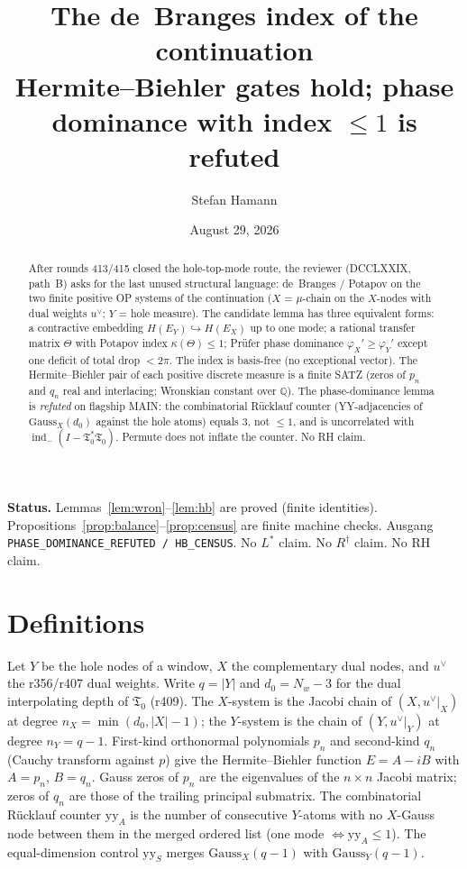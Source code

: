 \documentclass[11pt]{article}
\title{\bfseries The de~Branges index of the continuation\\[2mm]
\large Hermite--Biehler gates hold;
phase dominance with index $\le 1$ is refuted}
\author{Stefan Hamann}
\date{August 29, 2026}
\theoremstyle{remark}
\newcommand{\Tfrak}{\mathfrak{T}}
\newcommand{\indm}{\operatorname{ind}_{-}}
\begin{document}
\maketitle

\begin{abstract}\noindent
After rounds 413/415 closed the hole-top-mode route, the
reviewer (DCCLXXIX, path~B) asks for the last unused
structural language: de~Branges / Potapov on the two finite
positive OP systems of the continuation
($X$ = $\mu$-chain on the $X$-nodes with dual weights $u^\vee$;
$Y$ = hole measure).
The candidate lemma has three equivalent forms: a contractive
embedding $H(E_Y)\hookrightarrow H(E_X)$ up to one mode; a
rational transfer matrix $\Theta$ with Potapov index
$\kappa(\Theta)\le 1$; Pr\"ufer phase dominance
$\varphi_X'\ge\varphi_Y'$ except one deficit of total drop
$<2\pi$.
The index is basis-free (no exceptional vector).
The Hermite--Biehler pair of each positive discrete measure
is a finite SATZ (zeros of $p_n$ and $q_n$ real and
interlacing; Wronskian constant over $\mathbb{Q}$).
The phase-dominance lemma is \emph{refuted} on flagship MAIN:
the combinatorial R\"ucklauf counter (YY-adjacencies of
$\mathrm{Gauss}_X(d_0)$ against the hole atoms) equals $3$,
not $\le 1$, and is uncorrelated with
$\indm(I-\Tfrak_0^*\Tfrak_0)$.
Permute does not inflate the counter.
No RH claim.
\end{abstract}

\medskip\noindent
\textbf{Status.}\enspace
Lemmas~\ref{lem:wron}--\ref{lem:hb} are proved (finite
identities).
Propositions~\ref{prop:balance}--\ref{prop:census} are finite
machine checks.
Ausgang \texttt{PHASE\_DOMINANCE\_REFUTED / HB\_CENSUS}.
No $L^*$ claim.  No $R^\dagger$ claim.  No RH claim.

\section{Definitions}\label{sec:def}

Let $Y$ be the hole nodes of a window, $X$ the complementary
dual nodes, and $u^\vee$ the r356/r407 dual weights.
Write $q=|Y|$ and $d_0=N_w-3$ for the dual interpolating
depth of $\Tfrak_0$ (r409).
The $X$-system is the Jacobi chain of $(X,u^\vee|_X)$ at
degree $n_X=\min(d_0,|X|-1)$; the $Y$-system is the chain of
$(Y,u^\vee|_Y)$ at degree $n_Y=q-1$.
First-kind orthonormal polynomials $p_n$ and second-kind
$q_n$ (Cauchy transform against $p$) give the Hermite--Biehler
function $E=A-iB$ with $A=p_n$, $B=q_n$.
Gauss zeros of $p_n$ are the eigenvalues of the $n\times n$
Jacobi matrix; zeros of $q_n$ are those of the trailing
principal submatrix.
The combinatorial R\"ucklauf counter $\mathrm{yy}_A$ is the
number of consecutive $Y$-atoms with no $X$-Gauss node
between them in the merged ordered list
(one mode $\Leftrightarrow \mathrm{yy}_A\le 1$).
The equal-dimension control $\mathrm{yy}_S$ merges
$\mathrm{Gauss}_X(q-1)$ with $\mathrm{Gauss}_Y(q-1)$.
\end{document}
